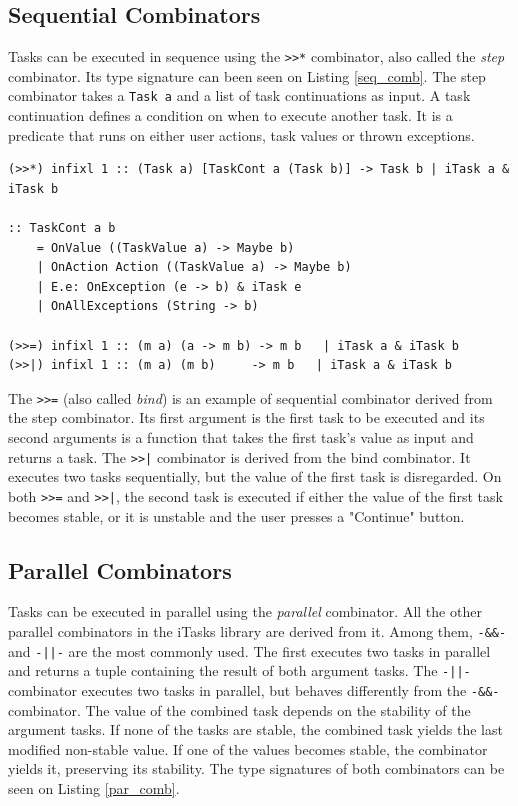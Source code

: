 \subsection{Sequential Combinators}

Tasks can be executed in sequence using the \texttt{>>*} combinator, also called the \textit{step} combinator. Its type signature can been seen on Listing \ref{seq_comb}. The step combinator takes a \texttt{Task a} and a list of task continuations as input. A task continuation defines a condition on when to execute another task. It is a predicate that runs on either user actions, task values or thrown exceptions.

\begin{lstlisting}[caption=Sequential combinators,label=seq_comb,captionpos=b]
(>>*) infixl 1 :: (Task a) [TaskCont a (Task b)] -> Task b | iTask a & iTask b

:: TaskCont a b                               
	= OnValue ((TaskValue a) -> Maybe b)         
	| OnAction Action ((TaskValue a) -> Maybe b) 
	| E.e: OnException (e -> b) & iTask e        
	| OnAllExceptions (String -> b)

(>>=) infixl 1 :: (m a) (a -> m b) -> m b   | iTask a & iTask b
(>>|) infixl 1 :: (m a) (m b)     -> m b   | iTask a & iTask b
\end{lstlisting}

The \texttt{>>=} (also called \textit{bind}) is an example of sequential combinator derived from the step combinator. Its first argument is the first task to be executed and its second arguments is a function that takes the first task's value as input and returns a task. The \texttt{>>|} combinator is derived from the bind combinator. It executes two tasks sequentially, but the value of the first task is disregarded. On both \texttt{>>=} and \texttt{>>|}, the second task is executed if either the value of the first task becomes stable, or it is unstable and the user presses a "Continue" button.

\subsection{Parallel Combinators}

Tasks can be executed in parallel using the \textit{parallel} combinator. All the other parallel combinators in the iTasks library are derived from it. Among them, \texttt{-\&\&-} and  \texttt{-||-} are the most commonly used. The first executes two tasks in parallel and returns a tuple containing the result of both argument tasks. The \texttt{-||-} combinator executes two tasks in parallel, but behaves differently from the \texttt{-\&\&-} combinator. The value of the combined task depends on the stability of the argument tasks. If none of the tasks are stable, the combined task yields the last modified non-stable value. If one of the values becomes stable, the combinator yields it, preserving its stability. The type signatures of both combinators can be seen on Listing \ref{par_comb}.

